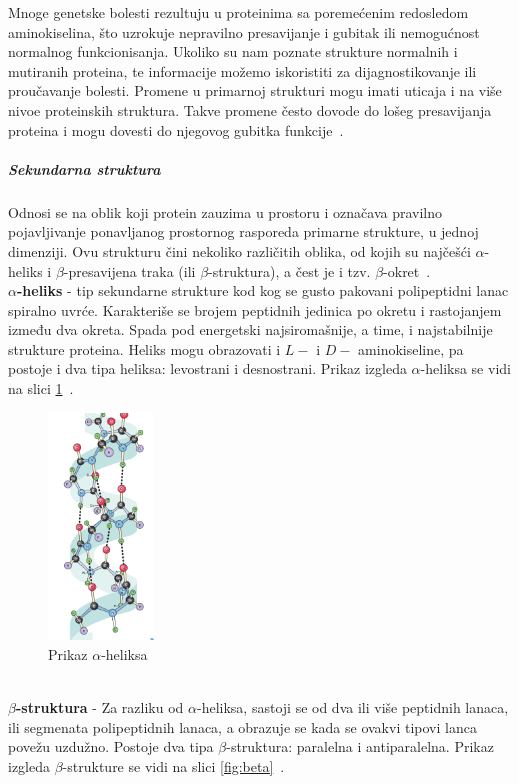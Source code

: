 Mnoge genetske bolesti rezultuju u proteinima sa poremećenim redosledom aminokiselina, što uzrokuje nepravilno presavijanje i gubitak ili nemogućnost normalnog funkcionisanja. Ukoliko su nam poznate strukture normalnih i mutiranih proteina, te informacije možemo iskoristiti za dijagnostikovanje ili proučavanje bolesti. Promene u primarnoj strukturi mogu imati uticaja i na više nivoe proteinskih struktura. Takve promene često dovode do lošeg presavijanja proteina i mogu dovesti do njegovog gubitka funkcije~\cite{flash,lippincott}.

\subparagraph{Sekundarna struktura}
Odnosi se na oblik koji protein zauzima u prostoru i označava pravilno pojavljivanje ponavljanog prostornog rasporeda primarne strukture, u jednoj dimenziji. Ovu strukturu čini nekoliko različitih oblika, od kojih su najčešći $\alpha$-heliks i $\beta$-presavijena traka (ili $\beta$-struktura), a čest je i tzv. $\beta$-okret~\cite{spasic,medbio}.\\
\textbf{$\alpha$-heliks} - tip sekundarne strukture kod kog se gusto pakovani polipeptidni lanac spiralno uvrće. Karakteriše se brojem peptidnih jedinica po okretu i rastojanjem između dva okreta. Spada pod energetski najsiromašnije, a time, i najstabilnije strukture proteina. Heliks mogu obrazovati i $L-$ i $D-$ aminokiseline, pa postoje i dva tipa heliksa: levostrani i desnostrani. Prikaz izgleda $\alpha$-heliksa se vidi na slici \ref{fig:aheliks}~\cite{spasic}.
\begin{figure}[h]
	\centering
    \includegraphics[width=0.25\textwidth]{Figures/BO/ahelix.png}
    \caption{Prikaz $\alpha$-heliksa~\cite{bmbg}}
    \label{fig:aheliks}
\end{figure}
 \\
\textbf{$\beta$-struktura} - Za razliku od $\alpha$-heliksa, sastoji se od dva ili više peptidnih lanaca, ili segmenata polipeptidnih lanaca, a obrazuje se kada se ovakvi tipovi lanca povežu uzdužno. Postoje dva tipa $\beta$-struktura: paralelna i antiparalelna. Prikaz izgleda $\beta$-strukture se vidi na slici \ref{fig:beta}~\cite{spasic}.\\

